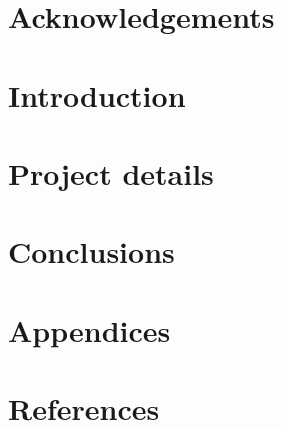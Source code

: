 \documentclass[12pt, a4paper, oneside, titlepage]{report}
\title{\printtitle}
\author{\printauthor}
\begin{document}
\makecover
\maketitlepage
\makeabstract

\chapter{Acknowledgements}


\tableofcontents
\addtocounter{chapter}{1}

\chapter{Introduction}


\chapter{Project details}


\chapter{Conclusions}


\chapter{Appendices}


\chapter{References}


\printglossaries
\addtocounter{chapter}{1}
\end{document}
